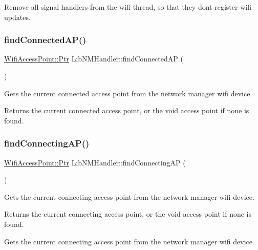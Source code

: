 Remove all signal handlers from the wifi thread, so that they don\textquotesingle{}t register wifi updates. \mbox{\label{classLibNMHandler_a71be7a3eea22000316d68233f900ec13}} 
\subsubsection{\texorpdfstring{find\+Connected\+A\+P()}{findConnectedAP()}}
{\footnotesize\ttfamily \mbox{\hyperlink{classWifiAccessPoint_ad18977f884076774803027efbaa131a0}{Wifi\+Access\+Point\+::\+Ptr}} Lib\+N\+M\+Handler\+::find\+Connected\+AP (\begin{DoxyParamCaption}{ }\end{DoxyParamCaption})\hspace{0.3cm}{\ttfamily [protected]}}

Gets the current connected access point from the network manager wifi device.

\begin{DoxyReturn}{Returns}
the current connected access point, or the void access point if none is found. 
\end{DoxyReturn}
\mbox{\label{classLibNMHandler_af38c5d5d511e2ac19c8a21becb171fcf}} 
\subsubsection{\texorpdfstring{find\+Connecting\+A\+P()}{findConnectingAP()}}
{\footnotesize\ttfamily \mbox{\hyperlink{classWifiAccessPoint_ad18977f884076774803027efbaa131a0}{Wifi\+Access\+Point\+::\+Ptr}} Lib\+N\+M\+Handler\+::find\+Connecting\+AP (\begin{DoxyParamCaption}{ }\end{DoxyParamCaption})\hspace{0.3cm}{\ttfamily [protected]}}

Gets the current connecting access point from the network manager wifi device.

\begin{DoxyReturn}{Returns}
the current connecting access point, or the void access point if none is found.
\end{DoxyReturn}
Gets the current connecting access point from the network manager wifi device.

